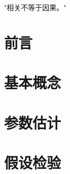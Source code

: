 \documentclass[11pt,a4paper,openany]{book}
\newcommand{\notebody}{
	\chapter*{前言}
	

	\chapter{基本概念}
	
	\chapter{参数估计}
	
	\chapter{假设检验}
	


}
\begin{document}
	

	\newpage

	\thispagestyle{empty}
	\vspace*{\fill}
	\begin{center}
		{\kaishu\fontsize{18}{28}\selectfont "相关不等于因果。"}
	\end{center}
	\vfill
	\newpage

	\setcounter{tocdepth}{2}

	\tableofcontents

	\setcounter{page}{0}
	\thispagestyle{empty}
	\newpage
	\notebody
\end{document}
